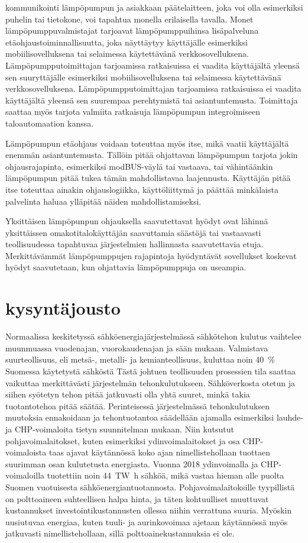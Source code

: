   kommunikointi lämpöpumpun ja asiakkaan päätelaitteen, joka voi olla esimerkiksi puhelin tai tietokone, voi tapahtua monella erilaisella tavalla. Monet lämpöpumppuvalmistajat tarjoavat lämpöpumppuihinsa lisäpalveluna etäohjaustoiminnallisuutta, joka näyttäytyy käyttäjälle esimerkiksi mobiilisovelluksena tai selaimessa käytettävänä verkkosovelluksena. Lämpöpumpputoimittajan tarjoamissa ratkaisuissa ei vaadita käyttäjältä yleensä sen suuryttäjälle esimerkiksi mobiilisovelluksena tai selaimessa käytettävänä verkkosovelluksena. Lämpöpumpputoimittajan tarjoamissa ratkaisuissa ei vaadita käyttäjältä yleensä sen suurempaa perehtymistä tai asiantuntemusta. Toimittaja saattaa myös tarjota valmiita ratkaisuja lämpöpumpun integroimiseen taloautomaation kanssa.

  Lämpöpumpun etäohjaus voidaan toteuttaa myös itse, mikä vaatii käyttäjältä enemmän asiantuntemusta. Tällöin pitää ohjattavan lämpöpumpun tarjota jokin ohjausrajapinta, esimerkiksi modBUS-väylä tai vastaava, tai vähintäänkin lämpöpumpun pitää tukea tämän mahdollistavaa laajennusta. Käyttäjän pitää itse toteuttaa ainakin ohjauslogiikka, käyttöliittymä ja päättää minkälaista palvelinta haluaa ylläpitää näiden mahdollistamiseksi.

  Yksittäisen lämpöpunpun ohjauksella saavutettavat hyödyt ovat lähinnä yksittäissen omakotitalokäyttäjän saavuttamia säästöjä tai vastaavasti teollisuudessa tapahtuvaa järjestelmien hallinnasta saavutettavia etuja. Merkittävämmät lämpöpumppujen rajapintoja hyödyntävät sovellukset koskevat hyödyt saavutetaan, kun ohjattavia lämpöpumppuja on useampia.

\section{kysyntäjousto}

  Normaalissa keskitetyssä sähköenergiajärjestelmässä sähkötehon kulutus vaihtelee muunmuassa vuodenajan, vuorokaudenajan ja sään mukaan. Valmistava suurteollisuus, eli metsä-, metalli- ja kemianteollisuus, kuluttaa noin \SI{40}{\percent} Suomessa käytetystä sähköstä Tästä johtuen teollisuuden prosessien tila saattaa vaikuttaa merkittävästi järjestelmän tehonkulutukseen\parencite{SVTehk}. Sähköverkosta otetun ja siihen syötetyn tehon pitää jatkuvasti olla yhtä suuret, minkä takia tuotantotehoa pitää säätää. Perinteisessä järjestelmässä tehonkulutuksen muutoksia ennakoidaan ja tehontuotantoa säädellään ajamalla esimerkiksi lauhde- ja \gls{CHP}-voimaloita tietyn suunnitelman mukaan.\parencite{energiateollisuus} Niin kutsutut pohjavoimalaitokset, kuten esimerkiksi ydinvoimalaitokset ja osa \gls{CHP}-voimaloista taas ajavat käytännössä koko ajan nimellistehollaan tuottaen suurimman osan kulutetusta energiasta. Vuonna 2018 ydinvoimalla ja CHP-voimaloilla tuotettiin noin \SI{44}{\tera\watt\hour} sähköä, mikä vastaa hieman alle puolta Suomen vuotuisesta sähköenergiantuotannosta.\parencite{SVTSaLaTuo} Pohjavoimalaitoksille tyypillistä on polttoaineen suhteellisen halpa hinta, ja täten kohtuulliset muuttuvat kustannukset investointikustannusten ollessa niihin verrattuna suuria. Myöskin uusiutuvaa energiaa, kuten tuuli- ja aurinkovoimaa ajetaan käytännössä myös jatkuvasti nimellistehollaan, sillä polttoainekustannuksia ei ole.

